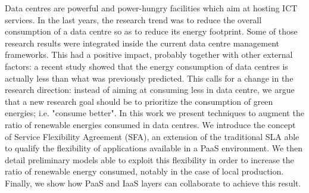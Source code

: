 
Data centres are powerful and power-hungry facilities which aim at hosting ICT services.
In the last years, the research trend was to reduce the overall consumption of a data centre so as to reduce its energy footprint.
Some of those research results were integrated inside the current data centre management frameworks.
This had a positive impact, probably together with other external factors: a recent study showed that the energy consumption of data centres is actually less than what was previously predicted.
This calls for a change in the research direction: instead of aiming at consuming less in data centre, we argue that a new research goal should be to prioritize the consumption of green energies; i.e. "consume better".
In this work we present techniques to augment the ratio of renewable energies consumed in data centres.
We introduce the concept of Service Flexibility Agreement (SFA), an extension of the traditional SLA able to qualify the flexibility of applications available in a PaaS environment.
We then detail preliminary models able to exploit this flexibility in order to increase the ratio of renewable energy consumed, notably in the case of local production.
Finally, we show how PaaS and IaaS layers can collaborate to achieve this result.
